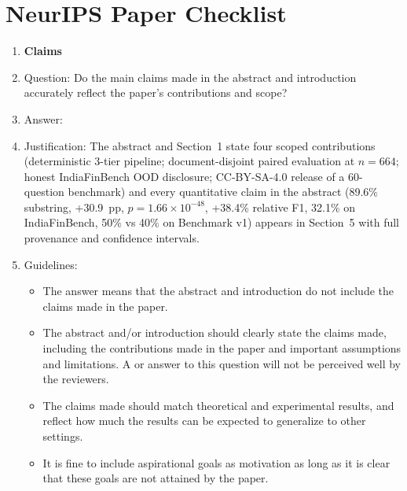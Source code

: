 \section*{NeurIPS Paper Checklist}

\begin{enumerate}

\item {\bf Claims}
    \item[] Question: Do the main claims made in the abstract and introduction accurately reflect the paper's contributions and scope?
    \item[] Answer: \answerYes{}
    \item[] Justification: The abstract and Section~1 state four scoped contributions (deterministic 3-tier pipeline; document-disjoint paired evaluation at $n{=}664$; honest IndiaFinBench OOD disclosure; CC-BY-SA-4.0 release of a 60-question benchmark) and every quantitative claim in the abstract (89.6\% substring, +30.9~pp, $p{=}1.66\times10^{-48}$, +38.4\% relative F1, 32.1\% on IndiaFinBench, 50\% vs 40\% on Benchmark v1) appears in Section~5 with full provenance and confidence intervals.
    \item[] Guidelines:
    \begin{itemize}
        \item The answer \answerNA{} means that the abstract and introduction do not include the claims made in the paper.
        \item The abstract and/or introduction should clearly state the claims made, including the contributions made in the paper and important assumptions and limitations. A \answerNo{} or \answerNA{} answer to this question will not be perceived well by the reviewers.
        \item The claims made should match theoretical and experimental results, and reflect how much the results can be expected to generalize to other settings.
        \item It is fine to include aspirational goals as motivation as long as it is clear that these goals are not attained by the paper.
    \end{itemize}


\end{enumerate}
